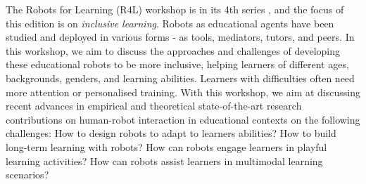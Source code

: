 \documentclass{sig-alternate-05-2015}
\begin{document}
The Robots for Learning (R4L) workshop is in its 4th series \cite{Johal2017_R4L}, and the focus of this edition is on \emph{inclusive learning}. 
Robots as educational agents have been studied and deployed in various forms - as tools, mediators, tutors, and peers. 
In this workshop, we aim to discuss the approaches and challenges of developing these educational robots to be more inclusive, helping learners of different ages, backgrounds, genders, and learning abilities. 
Learners with difficulties often need more attention or personalised training. 
With this workshop, we aim at discussing recent advances in empirical and theoretical state-of-the-art research contributions on human-robot interaction in educational contexts on the following challenges:  How to design robots to adapt to learners abilities? How to build long-term learning with robots? How can robots engage learners in playful learning activities? How can robots assist learners in multimodal learning scenarios?

%
%
%
%
%
%
%
%
\end{document}
